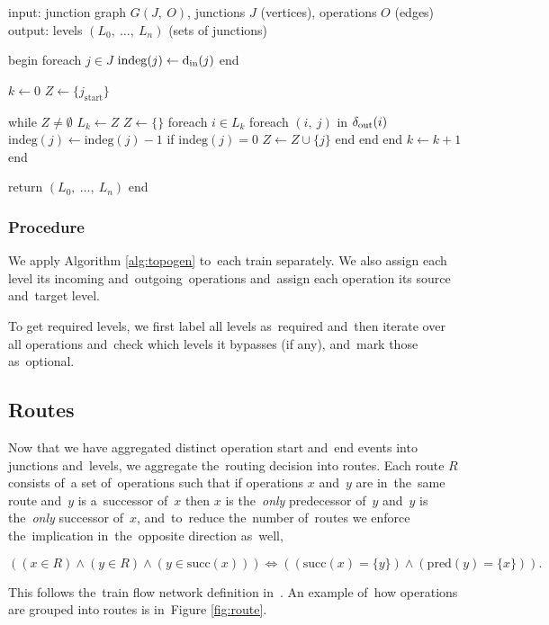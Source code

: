 \begin{algorithm}[float, caption={Topological generation algorithm}, label={alg:topogen}]
input: junction graph $G(J,\ O)$, junctions $J$ (vertices), operations $O$ (edges)
output: levels $(L_0,\ \dots,\ L_n)$ (sets of junctions)

begin
  foreach $j \in J$
    $\mathrm{indeg}(j) \gets \operatorname{d_{in}}(j)$
  end

  $k \gets 0$
  $Z \gets \{j_\mathrm{start}\}$

  while $Z \neq \emptyset$
    $L_k \gets Z$
    $Z \gets \{\}$
    foreach $i \in L_k$
      foreach $(i,\ j)$ in $\operatorname{\delta_{out}}(i)$
        $\mathrm{indeg}(j) \gets \mathrm{indeg}(j) - 1$
        if $\mathrm{indeg}(j) = 0$
          $Z \gets Z \cup \{j\}$
        end
      end
    end
    $k \gets k + 1$
  end

  return $(L_0,\ \dots,\ L_n)$
end
\end{algorithm}

\subsubsection{Procedure}
We apply Algorithm \ref{alg:topogen} to~each train separately. We also assign each level its incoming and~outgoing~operations and~assign each operation its source and~target level.

To get required levels, we first label all levels as~required and~then iterate over all operations and~check which levels it bypasses (if any), and~mark those as~optional.

\subsection{Routes}
Now that we have aggregated distinct operation start and~end events into junctions and~levels, we aggregate the~routing decision into routes. Each route $R$ consists of~a set of~operations such that if operations $x$ and~$y$ are in~the~same route and~$y$ is a~successor of~$x$ then $x$ is the~\emph{only} predecessor of~$y$ and~$y$ is the~\emph{only} successor of~$x$, and~to~reduce the~number of~routes we enforce the~implication in~the~opposite direction as~well,

\begin{equation}
  ((x \in R) \land (y \in R) \land (y \in \mathrm{succ}(x))) \iff ((\mathrm{succ}(x) = \{y\}) \land (\mathrm{pred}(y) = \{x\})).
\end{equation}

This follows the~train flow network definition in~\cite{fuchs2025optimizing}. An example of~how operations are grouped into routes is in~Figure \ref{fig:route}.

